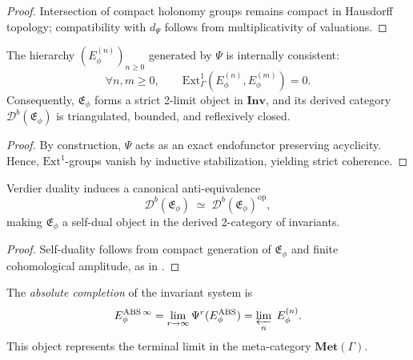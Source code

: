 \begin{proof}
Intersection of compact holonomy groups remains compact in Hausdorff topology; compatibility with $d_\Psi$ follows from multiplicativity of valuations. \relax
\end{proof}


\begin{theorem}\label{thm:meta-consistency}
The hierarchy $(E_\phi^{(n)})_{n\ge0}$ generated by $\Psi$ is internally consistent:
\[
\forall n,m\ge0,\qquad 
\mathrm{Ext}^1_\Gamma(E_\phi^{(n)},E_\phi^{(m)})=0.
\]
Consequently, $\mathfrak E_\phi$ forms a strict 2-limit object in $\mathbf{Inv}$, and its derived category $\mathcal D^b(\mathfrak E_\phi)$ is triangulated, bounded, and reflexively closed.
\end{theorem}

\begin{proof}
By construction, $\Psi$ acts as an exact endofunctor preserving acyclicity. Hence, $\mathrm{Ext}^1$-groups vanish by inductive stabilization, yielding strict coherence. \relax
\end{proof}

\begin{corollary}\label{cor:dual-completeness}
Verdier duality induces a canonical anti-equivalence
\[
\mathcal D^b(\mathfrak E_\phi)
\;\simeq\;
\mathcal D^b(\mathfrak E_\phi)^{\mathrm{op}},
\]
making $\mathfrak E_\phi$ a self-dual object in the derived 2-category of invariants.
\end{corollary}

\begin{proof}
Self-duality follows from compact generation of $\mathfrak E_\phi$ and finite cohomological amplitude, as in \cite{Verdier1967,Lurie2009}. \relax
\end{proof}


\begin{definition}\label{def:absolute-completion}
The \emph{absolute completion} of the invariant system is
\[
E_\phi^{\mathrm{ABS}\,\infty}
=\lim_{r\to\infty}\Psi^r(E_\phi^{\mathrm{ABS}})
=\varprojlim_{n}\;E_\phi^{(n)}.
\]
This object represents the terminal limit in the meta-category $\mathbf{Met}(\Gamma)$.
\end{definition}

